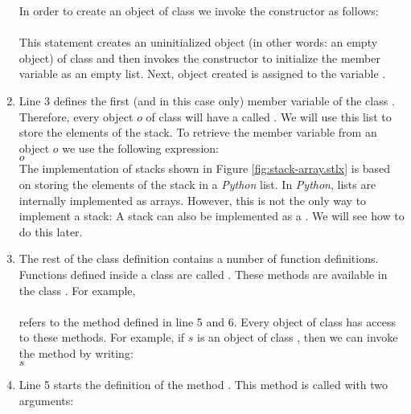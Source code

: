 \begin{enumerate}
      In order to create an object of class  we invoke the constructor as follows:
      \\[0.2cm]
      \hspace*{1.3cm}
      \\[0.2cm]
      This statement creates an uninitialized object (in other words: an empty object) of class 
      and then invokes the constructor  to initialize the member variable
       as an empty list.  Next, object created is assigned to the variable .
\item Line 3 defines the first (and in this case only) member variable of the class .
      Therefore, every object $o$ of class  will have a  
      called
      . 
      We will use this list to store the elements of the stack.  To retrieve the member variable
       from an object $o$ we use the following expression:
      \\[0.2cm]
      \hspace*{1.3cm}
      $o$
      \\[0.2cm]
      The implementation of stacks shown
      in Figure \ref{fig:stack-array.stlx} is based on storing the elements of the stack in a
      \textsl{Python} list.  In \textsl{Python}, lists are internally implemented as arrays.  However,
      this is not the only way to implement a stack: A stack can also be implemented as a .
      We will see how to do this later.
\item The rest of the class definition contains a number of function definitions.  Functions defined inside
      a class are called .  These methods are available in the class
      .  For example, 
      \\[0.2cm]
      \hspace*{1.3cm}
      \\[0.2cm]
      refers to the method  defined in line 5 and 6. Every object of class
       has access to these 
      methods.  For example, if $s$ is an object of class , then we can invoke the
      method  by writing:
      \\[0.2cm]
      \hspace*{1.3cm}
      $s$
\item Line 5 starts the definition of the method .  This method is called with two arguments:

\end{enumerate}
